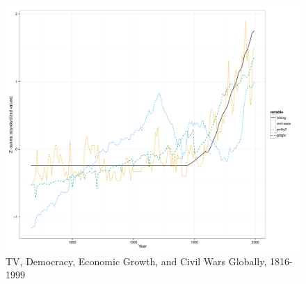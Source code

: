\documentclass[11pt,article,oneside]{memoir}
\makeatletter
\def\maxwidth{\ifdim\Gin@nat@width>\linewidth\linewidth
\else\Gin@nat@width\fi}
\let\Oldincludegraphics\includegraphics
\renewcommand{\includegraphics}[1]{\Oldincludegraphics[width=\maxwidth]{#1}}
\makeatother
\begin{document}
\begin{figure}[htbp]
\centering
\includegraphics{media_civil_war_files/figure-markdown/longrunplot.pdf}
\caption{TV, Democracy, Economic Growth, and Civil Wars Globally,
1816-1999}
\end{figure}
\end{document}
